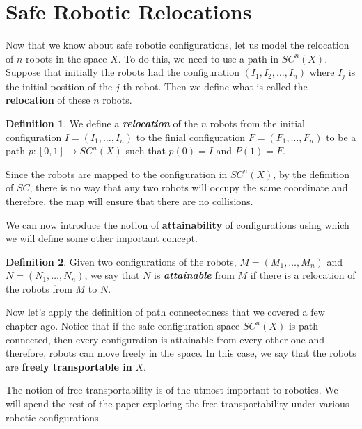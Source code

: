 \documentclass[12pt]{article}
\theoremstyle{definition}
\newtheorem*{definition}{Definition}
\begin{document}

\section*{\centering Safe Robotic Relocations}

Now that we know about safe robotic configurations, let us model the relocation
of $n$ robots in the space $X$. To do this, we need to use a path in $SC^n(X)$.
Suppose that initially the robots had the configuration $(I_1, I_2, \dots, I_n)$
where $I_j$ is the initial position of the $j$-th robot. Then we define what is
called the \textbf{relocation} of these $n$ robots.

\begin{definition}
\cite{13} We define a \textit{\textbf{relocation}} of the $n$ robots from the initial configuration
$I = (I_1, \dots, I_n)$ to the finial configuration $F = (F_1, \dots, F_n)$ to be a path
$p : [0, 1] \to SC^n(X)$ such that $p(0) = I$ and $P(1) = F$.
\end{definition}

Since the robots are mapped to the configuration in $SC^n(X)$, by the definition of $SC$,
there is no way that any two robots will occupy the same coordinate and therefore, the map
will ensure that there are no collisions.

\bigskip

We can now introduce the notion of \textbf{attainability} of configurations using which we will define
some other important concept.

\begin{definition}
\cite{14} Given two configurations of the robots, $M = (M_1, \dots, M_n)$ and $N = (N_1, \dots, N_n)$,
we say that $N$ is \textit{\textbf{attainable}} from $M$ if there is a relocation of the robots
from $M$ to $N$.
\end{definition}

Now let's apply the definition of path connectedness that we covered a few chapter ago.
Notice that if the safe configuration space $SC^n(X)$ is path connected, then every configuration
is attainable from every other one and therefore, robots can move freely in the space.
In this case, we say that the robots are \textbf{freely transportable in} $X$.

\bigskip

The notion of free transportability is of the utmost important to robotics. We will spend the
rest of the paper exploring the free transportability under various robotic configurations.
\end{document}
